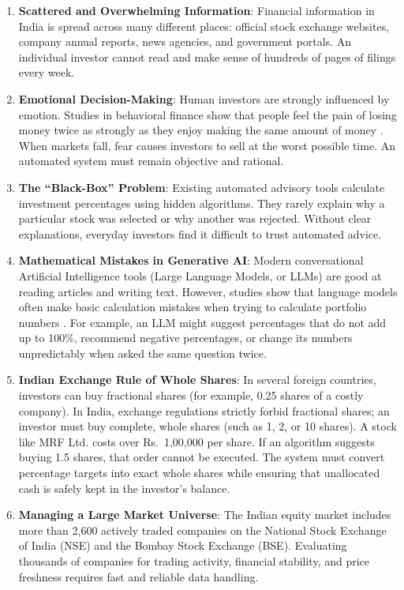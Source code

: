 \begin{enumerate}
    \item \textbf{Scattered and Overwhelming Information}: Financial information in India is spread across many different places: official stock exchange websites, company annual reports, news agencies, and government portals. An individual investor cannot read and make sense of hundreds of pages of filings every week.
    \item \textbf{Emotional Decision-Making}: Human investors are strongly influenced by emotion. Studies in behavioral finance show that people feel the pain of losing money twice as strongly as they enjoy making the same amount of money \cite{kahneman1979}. When markets fall, fear causes investors to sell at the worst possible time. An automated system must remain objective and rational.
    \item \textbf{The ``Black-Box'' Problem}: Existing automated advisory tools calculate investment percentages using hidden algorithms. They rarely explain why a particular stock was selected or why another was rejected. Without clear explanations, everyday investors find it difficult to trust automated advice.
    \item \textbf{Mathematical Mistakes in Generative AI}: Modern conversational Artificial Intelligence tools (Large Language Models, or LLMs) are good at reading articles and writing text. However, studies show that language models often make basic calculation mistakes when trying to calculate portfolio numbers \cite{kulpa2025}. For example, an LLM might suggest percentages that do not add up to 100\%, recommend negative percentages, or change its numbers unpredictably when asked the same question twice.
    \item \textbf{Indian Exchange Rule of Whole Shares}: In several foreign countries, investors can buy fractional shares (for example, 0.25 shares of a costly company). In India, exchange regulations strictly forbid fractional shares; an investor must buy complete, whole shares (such as 1, 2, or 10 shares). A stock like MRF Ltd. costs over Rs.~1,00,000 per share. If an algorithm suggests buying 1.5 shares, that order cannot be executed. The system must convert percentage targets into exact whole shares while ensuring that unallocated cash is safely kept in the investor's balance.
    \item \textbf{Managing a Large Market Universe}: The Indian equity market includes more than 2,600 actively traded companies on the National Stock Exchange of India (NSE) and the Bombay Stock Exchange (BSE). Evaluating thousands of companies for trading activity, financial stability, and price freshness requires fast and reliable data handling.
\end{enumerate}

